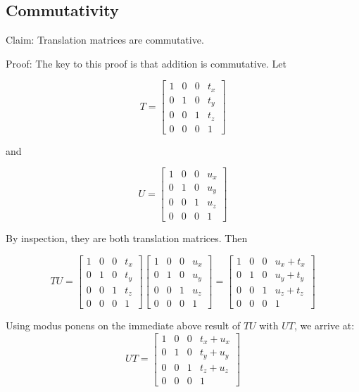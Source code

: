 \documentclass{article}
\begin{document}
\subsection{Commutativity}

Claim: Translation matrices are commutative.

Proof: The key to this proof is that addition is commutative. Let

$$
T = \begin{bmatrix}
1 & 0 & 0 & t_x \\
0 & 1 & 0 & t_y \\
0 & 0 & 1 & t_z \\
0 & 0 & 0 & 1
\end{bmatrix}
$$

and

$$
U = \begin{bmatrix}
1 & 0 & 0 & u_x \\
0 & 1 & 0 & u_y \\
0 & 0 & 1 & u_z \\
0 & 0 & 0 & 1
\end{bmatrix}
$$

By inspection, they are both translation matrices. Then

$$
T U = \begin{bmatrix}
1 & 0 & 0 & t_x \\
0 & 1 & 0 & t_y \\
0 & 0 & 1 & t_z \\
0 & 0 & 0 & 1
\end{bmatrix} \begin{bmatrix}
1 & 0 & 0 & u_x \\
0 & 1 & 0 & u_y \\
0 & 0 & 1 & u_z \\
0 & 0 & 0 & 1
\end{bmatrix} = \begin{bmatrix}
1 & 0 & 0 & u_x + t_x \\
0 & 1 & 0 & u_y + t_y \\
0 & 0 & 1 & u_z + t_z \\
0 & 0 & 0 & 1
\end{bmatrix}
$$

Using modus ponens on the immediate above result of $ T U $ with $ U T $, we 
arrive at:
$$
U T = \begin{bmatrix}
1 & 0 & 0 & t_x + u_x \\
0 & 1 & 0 & t_y + u_y \\
0 & 0 & 1 & t_z + u_z \\
0 & 0 & 0 & 1
\end{bmatrix}
$$
\end{document}
